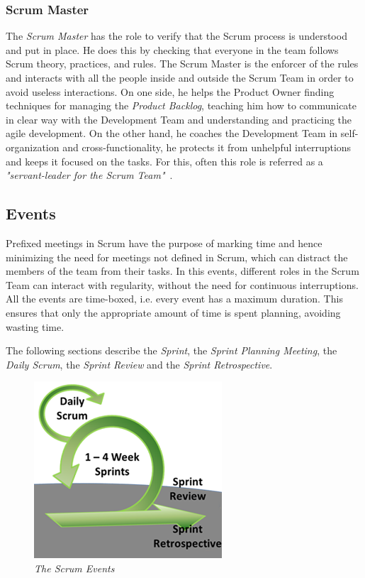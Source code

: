 			\subsubsection{Scrum Master}\label{ref_scrum_master}
			The \emph{Scrum Master} has the role to verify that the Scrum process is understood and put in place. He does this by checking that everyone in the team follows Scrum theory, practices, and rules. 
			The Scrum Master is the enforcer of the rules and interacts with all the people inside and outside the Scrum Team in order to avoid useless interactions.
			On one side, he helps the Product Owner finding techniques for managing the \emph{Product Backlog}, teaching him how to communicate in clear way with the Development Team and understanding and practicing the agile development. On the other hand, he coaches the Development Team in self-organization and cross-functionality, he protects it from unhelpful interruptions and keeps it focused on the tasks. 
			For this, often this role is referred as a \emph{"servant-leader for the Scrum Team"}~\cite[p.6]{scrumEnglishGuide}.


		\subsection{Events}\label{ref_scrum_events}
			Prefixed meetings in Scrum have the purpose of marking time and hence minimizing the need for meetings not defined in Scrum, which can distract the members of the team from their tasks. In this events, different roles in the Scrum Team can interact with regularity, without the need for continuous interruptions. All the events are time-boxed, i.e. every event has a maximum duration. This ensures that only the appropriate amount of time is spent planning, avoiding wasting time. 

			The following sections describe the \emph{Sprint}, the \emph{Sprint Planning Meeting}, the \emph{Daily Scrum}, the \emph{Sprint Review} and the \emph{Sprint Retrospective}.

			\begin{figure}[h]
			  \begin{center} 
			    \includegraphics[scale=0.8]{images/ch_04/scrum_events.png}
			  \end{center} 
			  \caption{\textit{The Scrum Events}}  
			  \label{fig:ScrumEvents}
		  	\end{figure}
			


